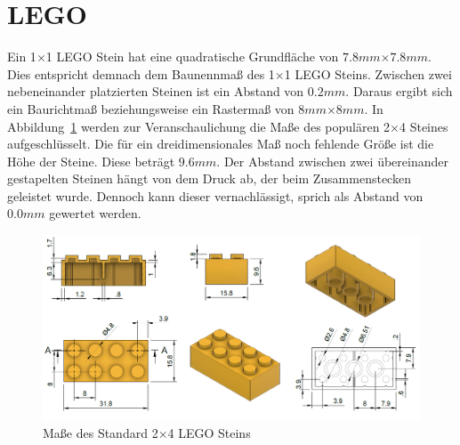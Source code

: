 
\section{LEGO}\label{basics:lego}
Ein 1$\times$1 LEGO Stein hat eine quadratische Grundfläche von \(7.8mm\)$\times$\(7.8mm\).
Dies entspricht demnach dem Baunennmaß des 1$\times$1 LEGO Steins.
Zwischen zwei nebeneinander platzierten Steinen ist ein Abstand von  \(0.2mm\).
Daraus ergibt sich ein Baurichtmaß beziehungsweise ein Rastermaß von \(8mm\)$\times$\(8mm\).
In Abbildung~\ref{fig:basics:Lego 2x4 Brick} werden zur Veranschaulichung die Maße des populären 2$\times$4 Steines aufgeschlüsselt.
Die für ein dreidimensionales Maß noch fehlende Größe ist die Höhe der Steine.
Diese beträgt \(9.6mm\).
Der Abstand zwischen zwei übereinander gestapelten Steinen hängt von dem Druck ab, der beim Zusammenstecken geleistet wurde.
Dennoch kann dieser vernachlässigt, sprich als Abstand von \(0.0mm\) gewertet werden.

\begin{figure}[h]
    \centering
    \includegraphics[width=0.8\columnwidth]{fig/LEGO 2x4 Brick horizontal.png}
    \caption{Maße des Standard 2$\times$4 LEGO Steins~\cite{LEGOBric2:online}}\label{fig:basics:Lego 2x4 Brick}
\end{figure}

